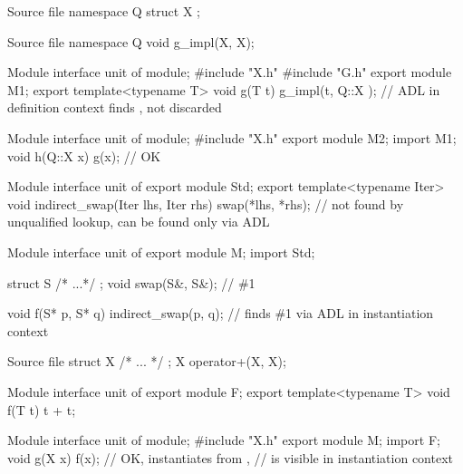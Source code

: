 \pnum
\begin{example}
\begin{codeblocktu}{Source file }
namespace Q {
  struct X { };
}
\end{codeblocktu}

\begin{codeblocktu}{Source file }
namespace Q {
  void g_impl(X, X);
}
\end{codeblocktu}

\begin{codeblocktu}{Module interface unit of }
module;
#include "X.h"
#include "G.h"
export module M1;
export template<typename T>
void g(T t) {
  g_impl(t, Q::X{ });   // ADL in definition context finds ,  not discarded
}
\end{codeblocktu}

\begin{codeblocktu}{Module interface unit of }
module;
#include "X.h"
export module M2;
import M1;
void h(Q::X x) {
   g(x);                // OK
}
\end{codeblocktu}
\end{example}

\pnum
\begin{example}
\begin{codeblocktu}{Module interface unit of }
export module Std;
export template<typename Iter>
void indirect_swap(Iter lhs, Iter rhs)
{
  swap(*lhs, *rhs);     //  not found by unqualified lookup, can be found only via ADL
}
\end{codeblocktu}

\begin{codeblocktu}{Module interface unit of }
export module M;
import Std;

struct S { /* ...*/ };
void swap(S&, S&);      // \#1

void f(S* p, S* q)
{
  indirect_swap(p, q);  // finds \#1 via ADL in instantiation context
}
\end{codeblocktu}
\end{example}

\pnum
\begin{example}
\begin{codeblocktu}{Source file }
struct X { /* ... */ };
X operator+(X, X);
\end{codeblocktu}

\begin{codeblocktu}{Module interface unit of }
export module F;
export template<typename T>
void f(T t) {
  t + t;
}
\end{codeblocktu}

\begin{codeblocktu}{Module interface unit of }
module;
#include "X.h"
export module M;
import F;
void g(X x) {
  f(x);             // OK, instantiates  from ,
                    //  is visible in instantiation context
}
\end{codeblocktu}
\end{example}

